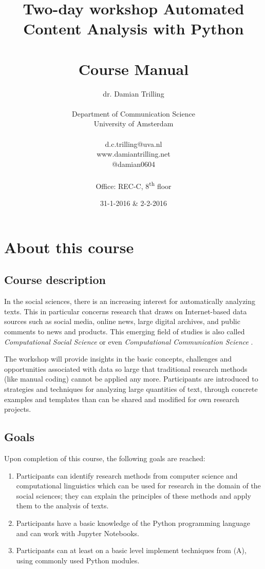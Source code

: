 \documentclass[a4paper,12pt]{report}
\title{Two-day workshop Automated Content Analysis with Python\\~\\Course Manual}
\author{dr. Damian Trilling\\~\\
Department of Communication Science
\\University of Amsterdam\\~\\d.c.trilling@uva.nl\\www.damiantrilling.net\\@damian0604\\~\\Office: REC-C, 8\textsuperscript{th} floor}
\date{31-1-2016 \& 2-2-2016}
\begin{document}
\maketitle



\section*{About this course}

\subsection*{Course description}
 
In the social sciences, there is an increasing interest for automatically analyzing texts. This in particular concerns research that draws on Internet-based data sources such as social media, online news, large digital archives, and public comments to news and products.  This emerging field of studies is also called \emph{Computational Social Science} \citep{Lazer2009} or even \emph{Computational Communication Science} \citep{Shah2015}.

The workshop will provide insights in the basic concepts, challenges and opportunities associated with data so large that traditional research methods (like manual coding) cannot be applied any more. Participants are introduced to strategies and techniques for analyzing large quantities of text, through concrete examples and templates than can be shared and modified for own research projects. 


\subsection*{Goals}
Upon completion of this course, the following goals are reached:
\begin{enumerate}[A]

\item Participants can identify research methods from computer science and computational linguistics which can be used for research in the domain of the social sciences; they can explain the principles of these methods and apply them to the analysis of texts.

\item Participants have a basic knowledge of the Python programming language and can work with Jupyter Notebooks.

\item Participants can at least on a basic level implement techniques from (A), using commonly used Python modules.

\end{enumerate}
\end{document}
